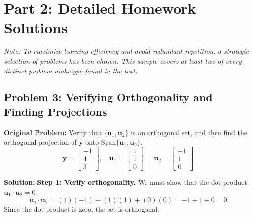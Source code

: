 \documentclass[11pt, letterpaper]{article}
\theoremstyle{definition}
\theoremstyle{remark}
\begin{document}
\newpage
\section{Part 2: Detailed Homework Solutions}

\textit{Note: To maximize learning efficiency and avoid redundant repetition, a strategic selection of problems has been chosen. This sample covers at least two of every distinct problem archetype found in the text.}

\subsection{Problem 3: Verifying Orthogonality and Finding Projections}
\textbf{Original Problem:} Verify that $\{\mathbf{u}_1, \mathbf{u}_2\}$ is an orthogonal set, and then find the orthogonal projection of $\mathbf{y}$ onto $\text{Span}\{\mathbf{u}_1, \mathbf{u}_2\}$.
\[ \mathbf{y} = \begin{bmatrix} -1 \\ 4 \\ 3 \end{bmatrix}, \quad \mathbf{u}_1 = \begin{bmatrix} 1 \\ 1 \\ 0 \end{bmatrix}, \quad \mathbf{u}_2 = \begin{bmatrix} -1 \\ 1 \\ 0 \end{bmatrix} \]

\textbf{Solution:}
\textbf{Step 1: Verify orthogonality.}
We must show that the dot product $\mathbf{u}_1 \cdot \mathbf{u}_2 = 0$.
\[ \mathbf{u}_1 \cdot \mathbf{u}_2 = (1)(-1) + (1)(1) + (0)(0) = -1 + 1 + 0 = 0 \]
Since the dot product is zero, the set is orthogonal.
\end{document}
